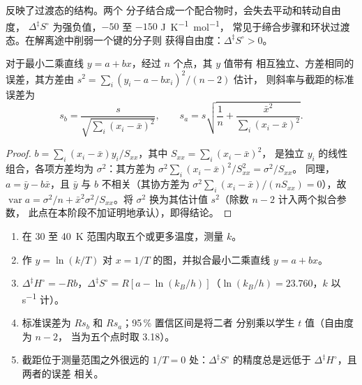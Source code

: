 反映了过渡态的结构。两个
分子结合成一个配合物时，会失去平动和转动自由度，
$\Delta^{\ddagger}S^\circ$ 为强负值，$-50$ 至 $-150$ \unit{J.K^{-1}.mol^{-1}}，
常见于缔合步骤和环状过渡态。在解离途中削弱一个键的分子则
获得自由度：$\Delta^{\ddagger}S^\circ > 0$。

\begin{proposition}[拟合直线的标准误差]\label{prop:b3:rate-theories:slope-uncertainty}
对于最小二乘直线 $y = a + bx$，经过 $n$ 个点，其 $y$ 值带有
相互独立、方差相同的误差，其方差由 $s^2 = \sum_i(y_i - a - bx_i)^2/(n - 2)$ 估计，
则斜率与截距的标准误差为
\[
  s_b = \frac{s}{\sqrt{\sum_i(x_i - \bar x)^2}}, \qquad
  s_a = s\sqrt{\frac1n + \frac{\bar x^2}{\sum_i(x_i - \bar x)^2}} .
\]
\end{proposition}

\begin{proof}
$b = \sum_i(x_i - \bar x)y_i/S_{xx}$，其中 $S_{xx} = \sum_i(x_i - \bar x)^2$，
是独立 $y_i$ 的线性组合，各项方差均为 $\sigma^2$：其方差为 $\sigma^2\sum_i(x_i - \bar x)^2/S_{xx}^2 = \sigma^2/S_{xx}$。
同理，$a = \bar y - b\bar x$，且 $\bar y$ 与 $b$ 不相关（其协方差为
$\sigma^2\sum_i(x_i - \bar x)/(nS_{xx}) = 0$），故 $\operatorname{var}a = \sigma^2/n + \bar x^2\sigma^2/S_{xx}$。将 $\sigma^2$
换为其估计值 $s^2$（除数 $n - 2$ 计入两个拟合参数，
此点在本阶段不加证明地承认），即得结论。
\end{proof}

\begin{method}[带不确定度的艾林图]\label{met:b3:rate-theories:eyring-plot}
\begin{enumerate}
  \item 在 30 至 \qty{40}{K} 范围内取五个或更多温度，测量 $k$。
  \item 作 $y = \ln(k/T)$ 对 $x = 1/T$ 的图，并拟合最小二乘直线 $y = a + bx$。
  \item $\Delta^{\ddagger}H^\circ = -Rb$，$\Delta^{\ddagger}S^\circ = R[a - \ln(k_B/h)]$（$\ln(k_B/h) = 23.760$，$k$ 以
        \unit{s^{-1}} 计）。
  \item 标准误差为 $Rs_b$ 和 $Rs_a$；95\,\% 置信区间是将二者
        分别乘以学生 $t$ 值（自由度为 $n - 2$，
        当为五个点时取 3.18）。
  \item 截距位于测量范围之外很远的 $1/T = 0$ 处：$\Delta^{\ddagger}S^\circ$
        的精度总是远低于 $\Delta^{\ddagger}H^\circ$，且两者的误差
        相关。
\end{enumerate}
\end{method}


